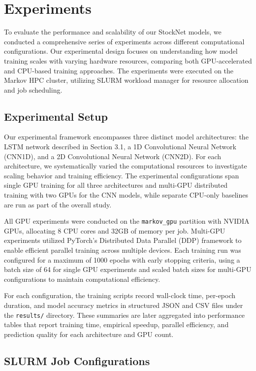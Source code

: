 \documentclass[sigconf]{acmart}
\begin{document}
\section{Experiments}

To evaluate the performance and scalability of our StockNet models, we conducted a comprehensive series of experiments across different computational configurations. Our experimental design focuses on understanding how model training scales with varying hardware resources, comparing both GPU-accelerated and CPU-based training approaches. The experiments were executed on the Markov HPC cluster, utilizing SLURM workload manager for resource allocation and job scheduling.

\subsection{Experimental Setup}

Our experimental framework encompasses three distinct model architectures: the LSTM network described in Section 3.1, a 1D Convolutional Neural Network (CNN1D), and a 2D Convolutional Neural Network (CNN2D). For each architecture, we systematically varied the computational resources to investigate scaling behavior and training efficiency. The experimental configurations span single GPU training for all three architectures and multi-GPU distributed training with two GPUs for the CNN models, while separate CPU-only baselines are run as part of the overall study.

All GPU experiments were conducted on the \texttt{markov\_gpu} partition with NVIDIA GPUs, allocating 8 CPU cores and 32GB of memory per job. Multi-GPU experiments utilized PyTorch's Distributed Data Parallel (DDP) framework to enable efficient parallel training across multiple devices. Each training run was configured for a maximum of 1000 epochs with early stopping criteria, using a batch size of 64 for single GPU experiments and scaled batch sizes for multi-GPU configurations to maintain computational efficiency.

For each configuration, the training scripts record wall-clock time, per-epoch duration, and model accuracy metrics in structured JSON and CSV files under the \texttt{results/} directory. These summaries are later aggregated into performance tables that report training time, empirical speedup, parallel efficiency, and prediction quality for each architecture and GPU count.

\subsection{SLURM Job Configurations}
\end{document}
